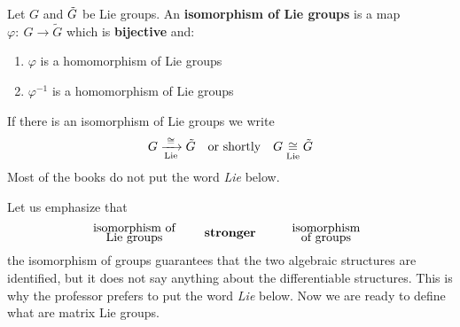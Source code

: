\documentclass[../main.tex]{subfiles}
\begin{document}
\begin{definition}
Let $G$ and $\Tilde{G}$ be Lie groups. An \textbf{isomorphism of Lie groups} is a map $\varphi: \ G\to \tilde{G}$ which is \textbf{bijective} and:
\begin{enumerate}
    \item $\varphi$ is a homomorphism of Lie groups
    \item $\varphi^{-1}$ is a homomorphism of Lie groups
\end{enumerate}
\end{definition}
\begin{kaobox}[frametitle=Notation]
If there is an isomorphism of Lie groups we write
\[
G \xrightarrow[\textrm{Lie}]{\cong} \Tilde{G} \quad \textrm{or shortly} \quad G\underset{\textrm{Lie}}{\cong} \Tilde{G}
\]
Most of the books do not put the word \textit{Lie} below.
\end{kaobox}
Let us emphasize that
\[
\text{\parbox{4 cm}{\centering isomorphism of \\[-4pt]  Lie groups}}\textbf{stronger} \text{\parbox{4 cm}{\centering isomorphism \\[-4pt]  of groups}}
\]
the isomorphism of groups guarantees that the two algebraic structures are identified, but it does not say anything about the differentiable structures. This is why the professor prefers to put the word \textit{Lie} below. Now we are ready to define what are matrix Lie groups.
\end{document}
